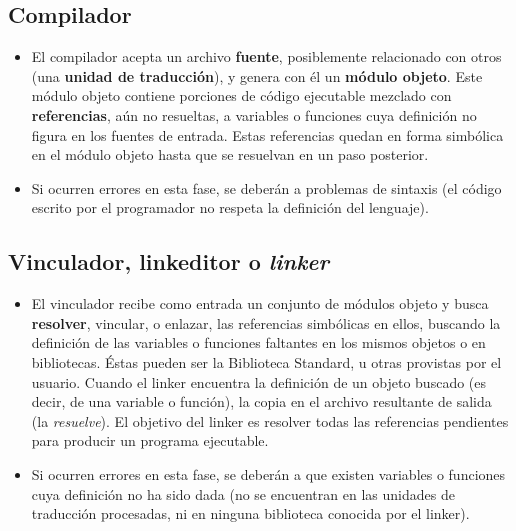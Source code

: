 \subsection{Compilador}
\begin{itemize}
	\item El compilador acepta un archivo \textbf{fuente}, posiblemente relacionado con
otros (una \textbf{unidad de traducción}), y genera con él un
\textbf{módulo objeto}. Este módulo objeto contiene porciones de
código ejecutable mezclado con \textbf{referencias}, aún no resueltas, a
variables o funciones cuya definición no figura en los fuentes de
entrada. Estas referencias quedan en forma simbólica en el módulo
objeto hasta que se resuelvan en un paso posterior. 
\item Si ocurren errores en esta fase, se deberán a problemas de sintaxis (el código escrito por el programador no respeta la definición del lenguaje).
\end{itemize}

\subsection{Vinculador, linkeditor o \textit{linker}}
\begin{itemize}
\item El vinculador recibe como entrada un conjunto de módulos objeto y
busca \textbf{resolver}, vincular, o enlazar, las referencias simbólicas en ellos,
buscando la definición de las variables o funciones faltantes en los
mismos objetos o en bibliotecas. Éstas pueden ser la Biblioteca
Standard, u otras provistas por el usuario. Cuando el linker encuentra la
definición de un objeto buscado (es decir, de una variable o
función), la copia en el archivo resultante de salida (la
\textit{resuelve}). El objetivo del linker es resolver todas las
referencias pendientes para producir un programa ejecutable. 
\item Si ocurren errores en esta fase, se deberán a que existen variables o funciones cuya definición no ha sido dada (no se encuentran en las unidades de traducción procesadas, ni en ninguna biblioteca conocida por el linker).
\end{itemize}

